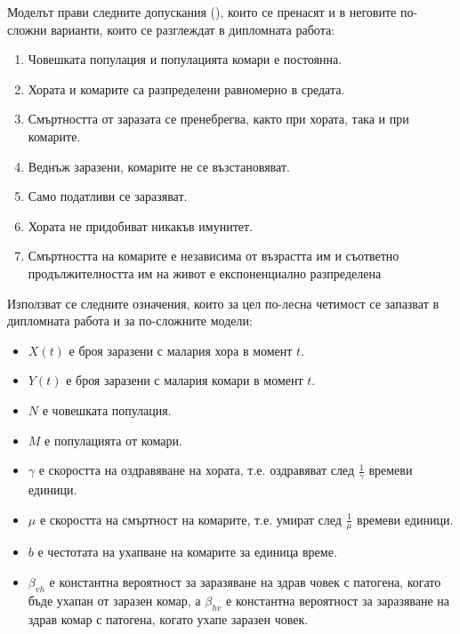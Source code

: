 Моделът прави следните допускания (\cite[стр~8,9]{Smith2012}), които се пренасят и в неговите по-сложни варианти, които се разглеждат в дипломната работа:
\begin{enumerate}
  \item Човешката популация и популацията комари е постоянна.
  \item Хората и комарите са разпределени равномерно в средата.
  \item Смъртността от заразата се пренебрегва, както при хората, така и при комарите.
  \item Веднъж заразени, комарите не се възстановяват.
  \item Само податливи се заразяват.
  \item Хората не придобиват никакъв имунитет.
  \item Смъртността на комарите е независима от възрастта им и съответно продължителността им на живот е експоненциално разпределена
\end{enumerate}

\begin{definition}
  \label{def:Parameters}
  Използват се следните означения, които за цел по-лесна четимост се запазват в дипломната работа и за по-сложните модели:
  \begin{itemize}
    \item $X(t)$ е броя заразени с малария хора в момент $t$.
    \item $Y(t)$ е броя заразени с малария комари в момент $t$.
    \item $N$ е човешката популация.
    \item $M$ е популацията от комари.
    \item $\gamma$ е скоростта на оздравяване на хората, т.е. оздравяват след $\frac{1}{\gamma}$ времеви единици.
    \item $\mu$ е скоростта на смъртност на комарите, т.е. умират след $\frac{1}{\mu}$ времеви единици.
    \item $b$ е честотата на ухапване на комарите за единица време.
    \item $\beta_{vh}$ е константна вероятност за заразяване на здрав човек с патогена, когато бъде ухапан от заразен комар, а $\beta_{hv}$ е константна вероятност за заразяване на здрав комар с патогена, когато ухапе заразен човек.
  \end{itemize}
\end{definition}

